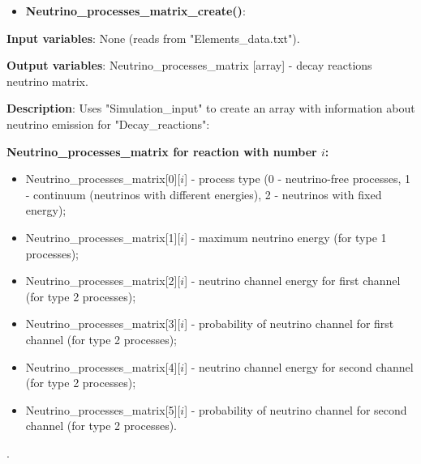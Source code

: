 \documentclass[a4paper,12pt]{article}
\newcommand{\namefunction}[4]{
  \begin{itemize}
    \item \textbf{#1}:
  \end{itemize}
  
  \textbf{Input variables}: #2.
  
  \textbf{Output variables}: #4.
  
  \textbf{Description}: #3.
}
\begin{document}
\vspace{1em}

\namefunction{Neutrino\_processes\_matrix\_create()}{None (reads from "Elements\_data.txt")}{Uses "Simulation\_input" to create an array with information about neutrino emission for "Decay\_reactions":

\textbf{Neutrino\_processes\_matrix for reaction with number $i$:}
\begin{itemize}
    \item Neutrino\_processes\_matrix[0][$i$] - process type (0 - neutrino-free processes, 1 - continuum (neutrinos with different energies), 2 - neutrinos with fixed energy);
    \item Neutrino\_processes\_matrix[1][$i$] - maximum neutrino energy (for type 1 processes);
    \item Neutrino\_processes\_matrix[2][$i$] - neutrino channel energy for first channel (for type 2 processes);
    \item Neutrino\_processes\_matrix[3][$i$] - probability of neutrino channel for first channel (for type 2 processes);
    \item Neutrino\_processes\_matrix[4][$i$] - neutrino channel energy for second channel (for type 2 processes);
    \item Neutrino\_processes\_matrix[5][$i$] - probability of neutrino channel for second channel (for type 2 processes).
\end{itemize}

}{Neutrino\_processes\_matrix [array] - decay reactions neutrino matrix}

\vspace{1em}
\end{document}
